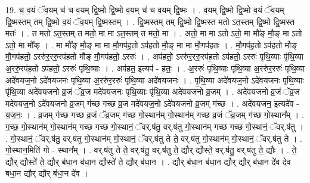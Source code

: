 \documentclass[17pt]{extarticle}
\begin{document}
19. च॒ व॒यं ॅव॒यम् च॑ च व॒यम् द्वि॒ष्मो द्वि॒ष्मो व॒यम् च॑ च व॒यम् द्वि॒ष्मः । . व॒यम् द्वि॒ष्मो द्वि॒ष्मो व॒यं ॅव॒यम् द्वि॒ष्मस्तम् तम् द्वि॒ष्मो व॒यं ॅव॒यम् द्वि॒ष्मस्तम् । . द्वि॒ष्मस्तम् तम् द्वि॒ष्मो द्वि॒ष्मस्त मतो ऽत॒स्तम् द्वि॒ष्मो द्वि॒ष्मस्त मतः॑ । . त मतो ऽत॒स्तम् त मतो॒ मा मा ऽत॒स्तम् त मतो॒ मा । . अतो॒ मा मा ऽतो ऽतो॒ मा मौ᳚ङ् मौ॒ङ् मा ऽतो ऽतो॒ मा मौ᳚क् । . मा मौ᳚ङ् मौ॒ङ् मा मा मौ॒गप॑ह॒तो ऽप॑हतो मौ॒ङ् मा मा मौ॒गप॑हतः । . मौ॒गप॑ह॒तो ऽप॑हतो मौङ् मौ॒गप॑हतो॒ ऽररु॑र॒ररु॒रप॑हतो मौङ् मौ॒गप॑हतो॒ ऽररुः॑ । . अप॑हतो॒ ऽररु॑र॒ररु॒रप॑ह॒तो ऽप॑हतो॒ ऽररुः॑ पृथि॒व्याः पृ॑थि॒व्या अ॒ररु॒रप॑ह॒तो ऽप॑हतो॒ ऽररुः॑ पृथि॒व्याः । . अप॑हत॒ इत्यप॑ - ह॒तः॒ । . अ॒ररुः॑ पृथि॒व्याः पृ॑थि॒व्या अ॒ररु॑र॒ररुः॑ पृथि॒व्या अदे॑वयज॒नो ऽदे॑वयजनः पृथि॒व्या अ॒ररु॑र॒ररुः॑ पृथि॒व्या अदे॑वयजनः । . पृ॒थि॒व्या अदे॑वयज॒नो ऽदे॑वयजनः पृथि॒व्याः पृ॑थि॒व्या अदे॑वयजनो व्र॒जं ॅव्र॒ज मदे॑वयजनः पृथि॒व्याः पृ॑थि॒व्या अदे॑वयजनो व्र॒जम् । . अदे॑वयजनो व्र॒जं ॅव्र॒ज मदे॑वयज॒नो ऽदे॑वयजनो व्र॒जम् ग॑च्छ गच्छ व्र॒ज मदे॑वयज॒नो ऽदे॑वयजनो व्र॒जम् ग॑च्छ । . अदे॑वयजन॒ इत्यदे॑व - य॒ज॒नः॒ । . व्र॒जम् ग॑च्छ गच्छ व्र॒जं ॅव्र॒जम् ग॑च्छ गो॒स्थान॑म् गो॒स्थान॑म् गच्छ व्र॒जं ॅव्र॒जम् ग॑च्छ गो॒स्थान᳚म् । . ग॒च्छ॒ गो॒स्थान॑म् गो॒स्थान॑म् गच्छ गच्छ गो॒स्थानं॒ ॅवर्.ष॑तु॒ वर्.ष॑तु गो॒स्थान॑म् गच्छ गच्छ गो॒स्थानं॒ ॅवर्.ष॑तु । . गो॒स्थानं॒ ॅवर्.ष॑तु॒ वर्.ष॑तु गो॒स्थान॑म् गो॒स्थानं॒ ॅवर्.ष॑तु ते ते॒ वर्.ष॑तु गो॒स्थान॑म् गो॒स्थानं॒ ॅवर्.ष॑तु ते । . गो॒स्थान॒मिति॑ गो - स्थान᳚म् । . वर्.ष॑तु ते ते॒ वर्.ष॑तु॒ वर्.ष॑तु ते॒ द्यौर् द्यौस्ते॒ वर्.ष॑तु॒ वर्.ष॑तु ते॒ द्यौः । . ते॒ द्यौर् द्यौस्ते॑ ते॒ द्यौर् ब॑धा॒न ब॑धा॒न द्यौस्ते॑ ते॒ द्यौर् ब॑धा॒न । . द्यौर् ब॑धा॒न ब॑धा॒न द्यौर् द्यौर् ब॑धा॒न दे॑व देव बधा॒न द्यौर् द्यौर् ब॑धा॒न दे॑व । \newline
\end{document}
